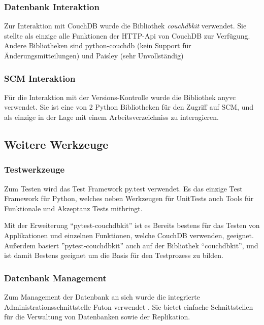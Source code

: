 \subsubsection{Datenbank Interaktion}

Zur Interaktion mit CouchDB wurde die Bibliothek \emph{couchdbkit} \cite{couchdbkit:website} verwendet.
Sie stellte als einzige alle Funktionen der HTTP-Api von CouchDB zur Verfügung.
Andere Bibliotheken sind python-couchdb (kein Support für Änderungsmitteilungen)
und Paisley (sehr Unvollständig)

\subsubsection{SCM Interaktion}

Für die Interaktion mit der Versions-Kontrolle wurde die Bibliothek anyvc \cite{anyvc:website} verwendet.
Sie ist eine von 2 Python Bibliotheken für den Zugriff auf SCM,
und als einzige in der Lage mit einem Arbeitsverzeichniss zu interagieren.

\subsection{Weitere Werkzeuge}

\subsubsection{Testwerkzeuge}

Zum Testen wird das Test Framework py.test \cite{pytest:website} verwendet.
Es das einzige Test Framework für Python,
welches neben Werkzeugen für UnitTests auch Tools für
Funktionale und Akzeptanz Tests mitbringt.

Mit der Erweiterung ``pytest-couchdbkit'' \cite{pytest:couchdbkit} ist es Bereits
bestens für das Testen von Applikationen und einzelnen Funktionen,
welche CouchDB verwenden, geeignet.
Außerdem basiert ''pytest-couchdbkit'' auch auf der Bibliothek ``couchdbkit'',
und ist damit Bestens geeignet um die Basis für den Testprozess zu bilden.

\subsubsection{Datenbank Management}

Zum Management der Datenbank an sich wurde die integrierte Administrationsschnittstelle Futon verwendet \cite{couchdb:futon}.
Sie bietet einfache Schnittstellen für die Verwaltung von Datenbanken sowie der Replikation.


